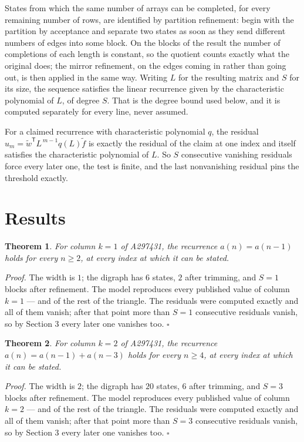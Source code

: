\documentclass[11pt]{article}
\newtheorem{theorem}{Theorem}
\theoremstyle{definition}
\begin{document}
States from which the same number of arrays can be completed, for every remaining number of rows, are identified by partition refinement: begin with the partition by acceptance and separate two states as soon as they send different numbers of edges into some block. On the blocks of the result the number of completions of each length is constant, so the quotient counts exactly what the original does; the mirror refinement, on the edges coming in rather than going out, is then applied in the same way. Writing $L$ for the resulting matrix and $S$ for its size, the sequence satisfies the linear recurrence given by the characteristic polynomial of $L$, of degree $S$. That is the degree bound used below, and it is computed separately for every line, never assumed.

For a claimed recurrence with characteristic polynomial $q$, the residual $u_m = \tilde w^{\mathsf T}L^{\,m-1}q(L)\tilde f$ is exactly the residual of the claim at one index and itself satisfies the characteristic polynomial of $L$. So $S$ consecutive vanishing residuals force every later one, the test is finite, and the last nonvanishing residual pins the threshold exactly.

\section{Results}

\begin{theorem} For column $k = 1$ of A297431, the recurrence $a(n) = a(n-1)$ holds for every $n \ge 2$, at every index at which it can be stated.\end{theorem}

{\itshape Proof.} The width is $1$; the digraph has $6$ states, $2$ after trimming, and $S = 1$ blocks after refinement. The model reproduces every published value of column $k = 1$ --- and of the rest of the triangle. The residuals were computed exactly and all of them vanish; after that point more than $S = 1$ consecutive residuals vanish, so by Section 3 every later one vanishes too. $\square$

\begin{theorem} For column $k = 2$ of A297431, the recurrence $a(n) = a(n-1) + a(n-3)$ holds for every $n \ge 4$, at every index at which it can be stated.\end{theorem}

{\itshape Proof.} The width is $2$; the digraph has $20$ states, $6$ after trimming, and $S = 3$ blocks after refinement. The model reproduces every published value of column $k = 2$ --- and of the rest of the triangle. The residuals were computed exactly and all of them vanish; after that point more than $S = 3$ consecutive residuals vanish, so by Section 3 every later one vanishes too. $\square$
\end{document}

